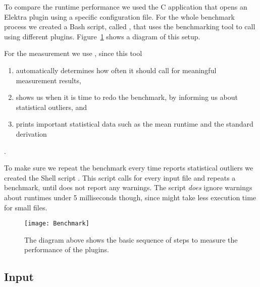 To compare the runtime performance we used the C application \FilePluginGetSet{} that opens an Elektra plugin using a specific configuration file. For the whole benchmark process we created a Bash script, called \FileBenchmarkYAML{}, that uses the benchmarking tool \ToolHyperfine{} to call \FilePluginGetSet{} using different  plugins. Figure~\ref{fig:benchmark} shows a diagram of this setup.

For the measurement we use \ToolHyperfine{}, since this tool

\begin{enumerate}
  \item automatically determines how often it should call \FilePluginGetSet{} for meaningful measurement results,
  \item shows us when it is time to redo the benchmark, by informing us about statistical outliers, and
  \item prints important statistical data such as the mean runtime and the standard derivation
\end{enumerate}

.

To make sure we repeat the benchmark every time \href{https://github.com/sharkdp/hyperfine}{} reports statistical outliers we created the Shell script \FileBenchmarkRuntime{}. This script calls \FileBenchmarkYAML{} for every input file and repeats a benchmark, until \href{https://github.com/sharkdp/hyperfine}{} does not report any warnings. The script \FileBenchmarkRuntime{} \emph{does} ignore warnings about runtimes under 5 milliseconds though, since \FilePluginGetSet{} might take less execution time for small  files.

\begin{figure}[H]
  \centering
    \texttt{[image: Benchmark]}
  \caption{The diagram above shows the basic sequence of steps to measure the performance of the  plugins.}
  \label{fig:benchmark}
\end{figure}

\subsection{Input}

\newcommand{\URLKeyFramesJSON}{https://master.libelektra.org/src/plugins/yajl/yajl/keyframes_complex.json}

